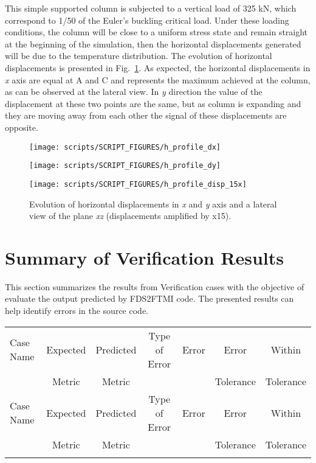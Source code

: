 \documentclass[11pt]{book}
\begin{document}
This simple supported column is subjected to a vertical load of 325 kN, which correspond to 1/50 of the Euler's buckling critical load. Under these loading conditions, the column will be close to a uniform stress state and remain straight at the beginning of the simulation, then the horizontal displacements generated will be due to the temperature distribution. The evolution of horizontal displacements is presented in Fig.~\ref{h_profile2}. As expected, the horizontal displacements in \textit{x} axis are equal at A and C and represents the maximum achieved at the column, as can be observed at the lateral view. In \textit{y} direction the value of the displacement at these two points are the same, but as column is expanding and they are moving away from each other the signal of these displacements are opposite.

\begin{figure}[ht]
\noindent
\parbox[c]{19em}{\texttt{[image: scripts/SCRIPT\_FIGURES/h\_profile\_dx]}} 
\parbox[c]{17.5em}{\texttt{[image: scripts/SCRIPT\_FIGURES/h\_profile\_dy]}}
\parbox[c]{1em}{\texttt{[image: scripts/SCRIPT\_FIGURES/h\_profile\_disp\_15x]}} 
\caption[The  results]{Evolution of horizontal displacements in \textit{x} and \textit{y} axis and a lateral view of the plane \textit{xz} (displacements amplified by x15).}
\label{h_profile2}
\end{figure}

\section{Summary of Verification Results}

This section summarizes the results from Verification cases with the objective of evaluate the output predicted by FDS2FTMI code. The presented results can help identify errors in the source code.

\begin{longtable}[c]{l c c c c c c }
\hline
Case Name & Expected & Predicted & Type of Error & Error & Error     & Within    \\
          & Metric   & Metric    &               &       & Tolerance & Tolerance \\ \hline \hline
\endfirsthead
\hline
Case Name & Expected & Predicted & Type of Error & Error & Error     & Within    \\
          & Metric   & Metric    &               &       & Tolerance & Tolerance \\ \hline \hline
\endhead
\hline
\endfoot
\hline
\endlastfoot

\end{longtable}


\end{document}
